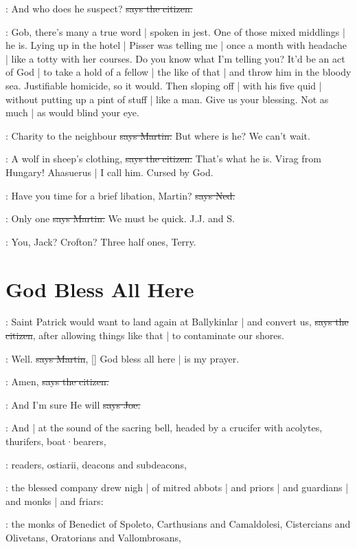 \citizen:
And who does he suspect?
\sout{says the citizen.}

\Nq:
Gob,
there's many a true word |
spoken in jest.
One of those mixed middlings |
he is.
Lying up in the hotel |
Pisser was telling me |
once a month with headache |
like a totty with her courses.
Do you know what I'm telling you?
It'd be an act of God |
to take a hold of a fellow |
the like of that |
and throw him in the bloody sea.
Justifiable homicide,
so it would.
Then sloping off |
with his five quid |
without putting up a pint of stuff |
like a man.
Give us your blessing.
Not as much |
as would blind your eye.

\cunningham:
Charity to the neighbour
\sout{says Martin.}
But where is he?
We can't wait.

\citizen:
A wolf in sheep's clothing,
\sout{says the citizen.}
That's what he is.
Virag from Hungary!
Ahasuerus |
I call him.
Cursed by God.

\lambert:
Have you time for a brief libation,
Martin?
\sout{says Ned.}

\cunningham:
Only one
\sout{says Martin.}
We must be quick.
J.J. and S.

\lambert:
You,
Jack?
Crofton?
Three half ones,
Terry.


\section{God Bless All Here}

\citizen:
Saint Patrick would want to land again at Ballykinlar |
and convert us,
\sout{says the citizen},
after allowing things like that |
to contaminate our shores.

\cunningham:
Well.
\sout{says Martin},
[]
God bless all here |
is my prayer.

\citizen:
Amen,
\sout{says the citizen.}

\joe:
And I'm sure He will
\sout{says Joe.}

:
And |
at the sound of the sacring bell,
headed by a crucifer with acolytes,
thurifers,
boat·bearers,

:
readers,
ostiarii,
deacons and subdeacons,

:
the blessed company drew nigh |
of mitred abbots |
and priors |
and guardians |
and monks |
and friars:

:
the monks of Benedict of Spoleto,
Carthusians and Camaldolesi,
Cistercians and Olivetans,
Oratorians and Vallombrosans,

